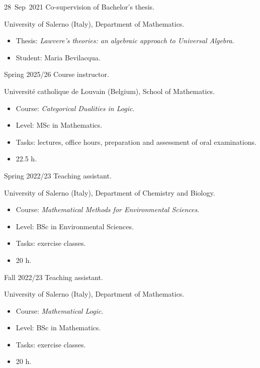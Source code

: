 \chronorow
  {28~Sep~2021}
  {Co-supervision of Bachelor's thesis.}
  {\textcolor{secondary}{University of Salerno (Italy), Department of Mathematics.}
   \begin{itemize}
     \item Thesis: \emph{Lawvere's theories: an algebraic approach to Universal Algebra}.
     \item Student: Maria Bevilacqua.
   \end{itemize}}


\chronorow
  {Spring 2025/26}
  {Course instructor.}
  {\textcolor{secondary}{Université catholique de Louvain (Belgium), School of Mathematics.}
   \begin{itemize}
     \item Course: \emph{Categorical Dualities in Logic}.
     \item Level: MSc in Mathematics.
     \item Tasks: lectures, office hours, preparation and assessment of oral examinations.
     \item 22.5 h.
   \end{itemize}}

\chronorow
  {Spring 2022/23}
  {Teaching assistant.}
  {\textcolor{secondary}{University of Salerno (Italy), Department of Chemistry and Biology.}
   \begin{itemize}
     \item Course: \emph{Mathematical Methods for Environmental Sciences}.
     \item Level: BSc in Environmental Sciences.
     \item Tasks: exercise classes.
     \item 20 h.
   \end{itemize}}

\chronorow
  {Fall 2022/23}
  {Teaching assistant.}
  {\textcolor{secondary}{University of Salerno (Italy), Department of Mathematics.}
   \begin{itemize}
     \item Course: \emph{Mathematical Logic}.
     \item Level: BSc in Mathematics.
     \item Tasks: exercise classes.
     \item 20 h.
   \end{itemize}}


